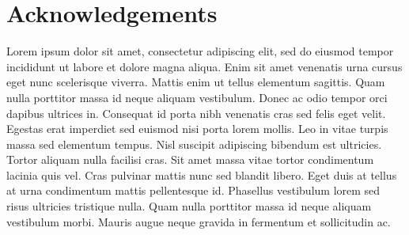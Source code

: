\chapter*{Acknowledgements}
\label{chap:ack}
Lorem ipsum dolor sit amet, consectetur adipiscing elit, sed do eiusmod tempor incididunt ut labore et dolore magna aliqua.
Enim sit amet venenatis urna cursus eget nunc scelerisque viverra.
Mattis enim ut tellus elementum sagittis.
Quam nulla porttitor massa id neque aliquam vestibulum.
Donec ac odio tempor orci dapibus ultrices in.
Consequat id porta nibh venenatis cras sed felis eget velit.
Egestas erat imperdiet sed euismod nisi porta lorem mollis.
Leo in vitae turpis massa sed elementum tempus.
Nisl suscipit adipiscing bibendum est ultricies.
Tortor aliquam nulla facilisi cras. Sit amet massa vitae tortor condimentum lacinia quis vel.
Cras pulvinar mattis nunc sed blandit libero.
Eget duis at tellus at urna condimentum mattis pellentesque id.
Phasellus vestibulum lorem sed risus ultricies tristique nulla.
Quam nulla porttitor massa id neque aliquam vestibulum morbi.
Mauris augue neque gravida in fermentum et sollicitudin ac.
